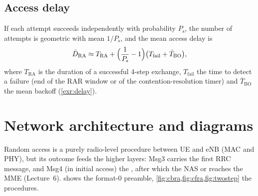 \documentclass[11pt,a4paper]{article}
\begin{document}
\begin{acnfigure}
  \caption{Expected successful UEs per PRACH occasion (left axis, \cref{eq:nsucc}) and per-UE success
  probability (right axis, \cref{eq:psucc}) for $M = 54$ contention preambles.}
  \label{fig:collision}
\end{acnfigure}

\subsection{Access delay}
If each attempt succeeds independently with probability $P_\mathrm{s}$, the number of attempts is geometric
with mean $1/P_\mathrm{s}$, and the mean access delay is
\begin{equation}\label{eq:delay}
  \bar D_{\mathrm{RA}} \approx T_{\mathrm{RA}} + \Bigl(\frac{1}{P_\mathrm{s}}-1\Bigr)\bigl(T_{\mathrm{fail}} + \bar T_{\mathrm{BO}}\bigr),
\end{equation}
where $T_{\mathrm{RA}}$ is the duration of a successful 4-step exchange, $T_{\mathrm{fail}}$ the time to
detect a failure (end of the RAR window or of the contention-resolution timer) and $\bar T_{\mathrm{BO}}$ the
mean backoff (\cref{exr:delay}).

\section{Network architecture and diagrams}
Random access is a purely radio-level procedure between UE and eNB (MAC and PHY), but its outcome
feeds the higher layers: Msg3 carries the first RRC message, and Msg4 (in initial access) the
, after which the NAS  or  reaches the
MME (Lecture~6).  shows the format-0 preamble, \cref{fig:cbra,fig:cfra,fig:twostep} the
procedures.

\begin{acnfigure}
  \caption{Preamble format 0. The cyclic prefix absorbs the round-trip delay (RTD) and delay spread; the
  guard time keeps a late preamble from overlapping the next subframe.}
  \label{fig:prach}
\end{acnfigure}

\end{document}
